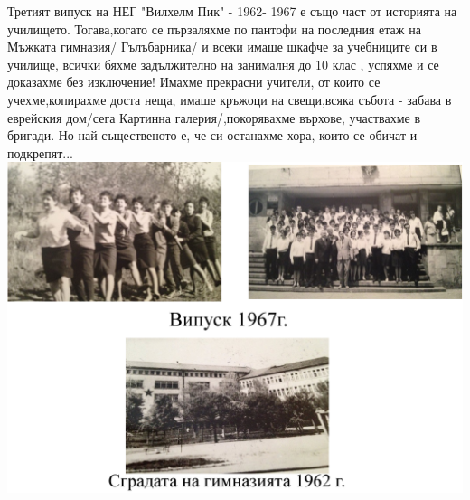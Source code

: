 \begin{multicols}{3}
Третият випуск на НЕГ "Вилхелм Пик" - 1962- 1967 е също част от историята на 
училището. Тогава,когато се пързаляхме по пантофи на последния етаж на Мъжката 
гимназия/ Гълъбарника/ и всеки имаше шкафче за учебниците си в училище, всички 
бяхме задължително на занималня до 10 клас , успяхме и се доказахме без 
изключение! 
Имахме прекрасни учители, от които се учехме,копирахме доста неща, 
имаше кръжоци на свещи,всяка събота - забава в еврейския дом/сега Картинна 
галерия/,покорявахме върхове, участвахме в бригади. Но най-същественото е, че си 
останахме хора, които се обичат и подкрепят... \\[19cm]

\includegraphics[width=5.5in]{./treti_vipusk/3.jpg} 

\end{multicols}